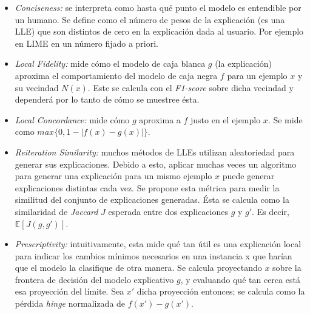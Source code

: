 \begin{itemize}
\item \textit{Conciseness: }se interpreta como hasta qué punto el modelo es entendible por un humano. Se define como el número de pesos de la explicación (es una LLE) que son distintos de cero en la explicación dada al usuario. Por ejemplo en LIME en un número fijado a priori.
\item \textit{Local Fidelity: }mide cómo el modelo de caja blanca $g$ (la explicación) aproxima el comportamiento del modelo de caja negra $f$ para un ejemplo $x$ y su vecindad $N(x)$. Este se calcula con el \textit{F1-score} sobre dicha vecindad y dependerá por lo tanto de cómo se muestree ésta. 
\item \textit{Local Concordance: }mide cómo $g$ aproxima a $f$ justo en el ejemplo $x$. Se mide como $max\{0, 1-|f(x)-g(x)|\}$.  
\item \textit{Reiteration Similarity: }muchos métodos de LLEs utilizan aleatoriedad para generar sus explicaciones. Debido a esto, aplicar muchas veces un algoritmo para generar una explicación para un mismo ejemplo $x$ puede generar explicaciones distintas cada vez. Se propone esta métrica para medir la similitud del conjunto de explicaciones generadas. Ésta se calcula como la similaridad de \textit{Jaccard} $J$ esperada entre dos explicaciones $g$ y $g'$. Es decir, $\mathbb{E}[J(g,g')]$.
\item \textit{Prescriptivity: } intuitivamente, esta mide qué tan útil es una explicación local para indicar los cambios mínimos necesarios en una instancia x que harían que el modelo la clasifique de otra manera. Se calcula proyectando $x$ sobre la frontera de decisión del modelo explicativo $g$, y evaluando qué tan cerca está esa proyección del límite. Sea $x'$ dicha proyección entonces; se calcula como la pérdida \textit{hinge} normalizada de $f(x')-g(x')$. 
\end{itemize}


